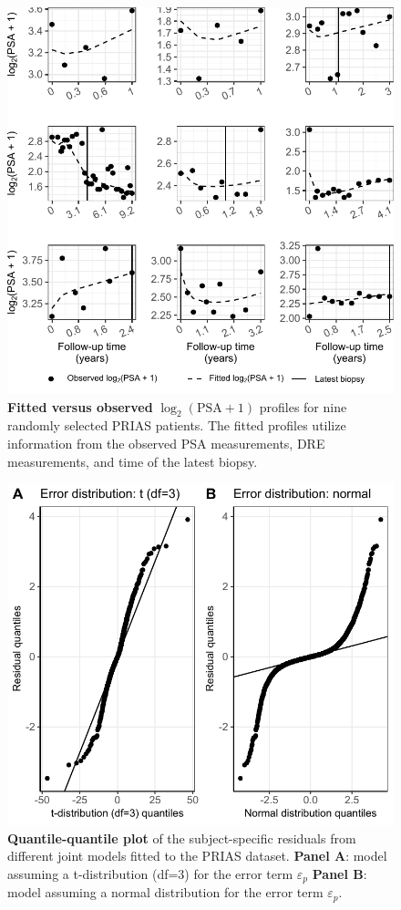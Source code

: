 \begin{subappendices}
\begin{figure}
\includegraphics{contents/c3/images/c3_fig_app4.pdf}
\caption{\textbf{Fitted versus observed} ${\log_2(\mbox{PSA} + 1)}$ profiles for nine randomly selected PRIAS patients. The fitted profiles utilize information from the observed PSA measurements, DRE measurements, and time of the latest biopsy.}
\label{c3:fig:app4}
\end{figure}

\begin{figure}
\includegraphics{contents/c3/images/c3_fig_app5.pdf}
\caption{\textbf{Quantile-quantile plot} of the subject-specific residuals from different joint models fitted to the PRIAS dataset. \textbf{Panel A}: model assuming a t-distribution (df=3) for the error term $\varepsilon_p$ \textbf{Panel B}: model assuming a normal distribution for the error term $\varepsilon_p$.}
\label{c3:fig:app5}
\end{figure}


\end{subappendices}
